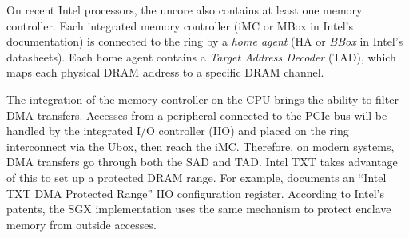 On recent Intel processors, the uncore also contains at least one memory
controller. Each integrated memory controller (iMC or MBox in Intel's
documentation) is connected to the ring by a \textit{home agent} (HA or
\textit{BBox} in Intel's datasheets). Each home agent contains a
\textit{Target Address Decoder} (TAD), which maps each physical DRAM address to
a specific DRAM channel.

The integration of the memory controller on the CPU brings the ability to
filter DMA transfers. Accesses from a peripheral connected to the PCIe bus will
be handled by the integrated I/O controller (IIO) and placed on the ring
interconnect via the Ubox, then reach the iMC. Therefore, on modern systems,
DMA transfers go through both the SAD and TAD. Intel TXT takes advantage of
this to set up a protected DRAM range. For example, \cite{intel2015datasheet}
documents an ``Intel TXT DMA Protected Range'' IIO configuration register.
According to Intel's patents, the SGX implementation uses the same mechanism to
protect enclave memory from outside accesses.
